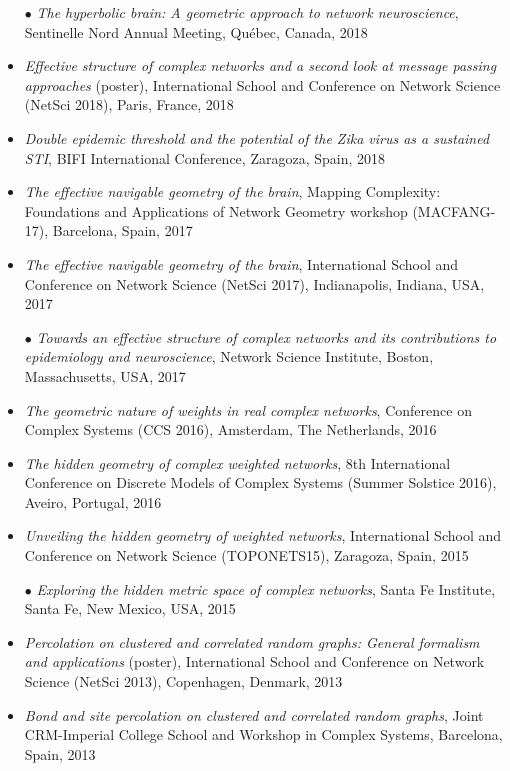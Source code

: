 \documentclass[11pt]{article}
\begin{document}
\begin{itemize}[itemsep=0.5em]
%
  \item[$\bullet$] \textit{The hyperbolic brain: A geometric approach to network neuroscience}, Sentinelle Nord Annual Meeting, Qu\'ebec, Canada, 2018
%
  \item \textit{Effective structure of complex networks and a second look at message passing approaches} (poster), International School and Conference on Network Science (NetSci 2018), Paris, France, 2018
%
  \item \textit{Double epidemic threshold and the potential of the Zika virus as a sustained STI}, BIFI International Conference, Zaragoza, Spain, 2018
%
  \item \textit{The effective navigable geometry of the brain}, Mapping Complexity: Foundations and Applications of Network Geometry workshop (MACFANG-17), Barcelona, Spain, 2017
%
  \item \textit{The effective navigable geometry of the brain}, International School and Conference on Network Science (NetSci 2017), Indianapolis, Indiana, USA, 2017
%
  \item[$\bullet$] \textit{Towards an effective structure of complex networks and its contributions to epidemiology and neuroscience}, Network Science Institute, Boston, Massachusetts, USA, 2017
%
  \item \textit{The geometric nature of weights in real complex networks}, Conference on Complex Systems (CCS 2016), Amsterdam, The Netherlands, 2016
%
  \item \textit{The hidden geometry of complex weighted networks}, 8th International Conference on Discrete Models of Complex Systems (Summer Solstice 2016), Aveiro, Portugal, 2016
%
  \item \textit{Unveiling the hidden geometry of weighted networks}, International School and Conference on Network Science (TOPONETS15), Zaragoza, Spain, 2015
%
  \item[$\bullet$] \textit{Exploring the hidden metric space of complex networks}, Santa Fe Institute, Santa Fe, New Mexico, USA, 2015
%
  \item \textit{Percolation on clustered and correlated random graphs: General formalism and applications} (poster), International School and Conference on Network Science (NetSci 2013), Copenhagen, Denmark, 2013
%
  \item \textit{Bond and site percolation on clustered and correlated random graphs}, Joint CRM-Imperial College School and Workshop in Complex Systems, Barcelona, Spain, 2013

\end{itemize}
\end{document}
